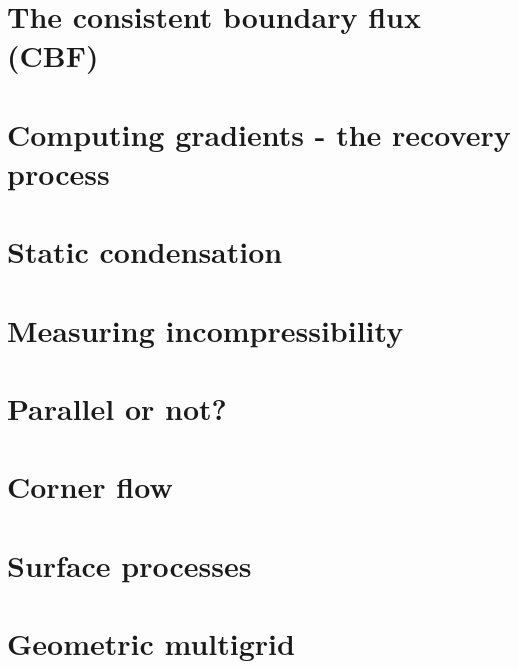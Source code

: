 \section{The consistent boundary flux (CBF) \label{ss:cbf}}  %
\newpage %
\section{Computing gradients - the recovery process \label{ss:gradrecovery}}  %
\newpage %
\section{Static condensation}  %
\newpage %
\section{Measuring incompressibility \label{ss_incomp}}  %
\newpage %
\section{Parallel or not?} \label{sec:parallel}  %
\newpage %
\section{Corner flow} \label{sec:cornerflow}  %
\newpage %
\section{Surface processes \label{sec:surfaceprocesses}}  %
\newpage %
\section{Geometric multigrid}  %
\newpage %
